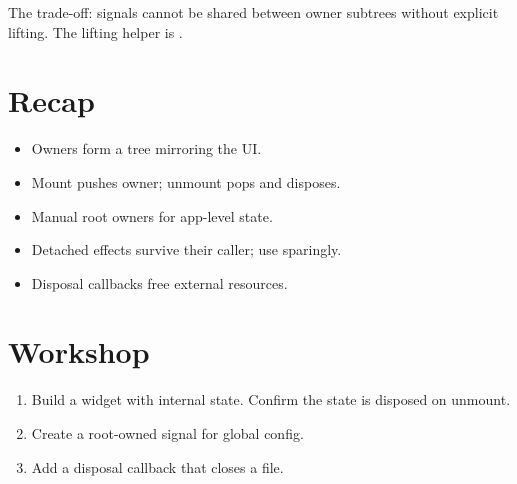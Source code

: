 The trade-off: signals cannot be shared between owner
subtrees without explicit lifting. The lifting helper is
.

\section{Recap}

\begin{recap}
\begin{itemize}[leftmargin=*]
  \item Owners form a tree mirroring the UI.
  \item Mount pushes owner; unmount pops and disposes.
  \item Manual root owners for app-level state.
  \item Detached effects survive their caller; use sparingly.
  \item Disposal callbacks free external resources.
\end{itemize}
\end{recap}

\section*{Workshop}

\begin{enumerate}[leftmargin=*]
  \item Build a widget with internal state. Confirm the
    state is disposed on unmount.
  \item Create a root-owned signal for global config.
  \item Add a disposal callback that closes a file.
\end{enumerate}
